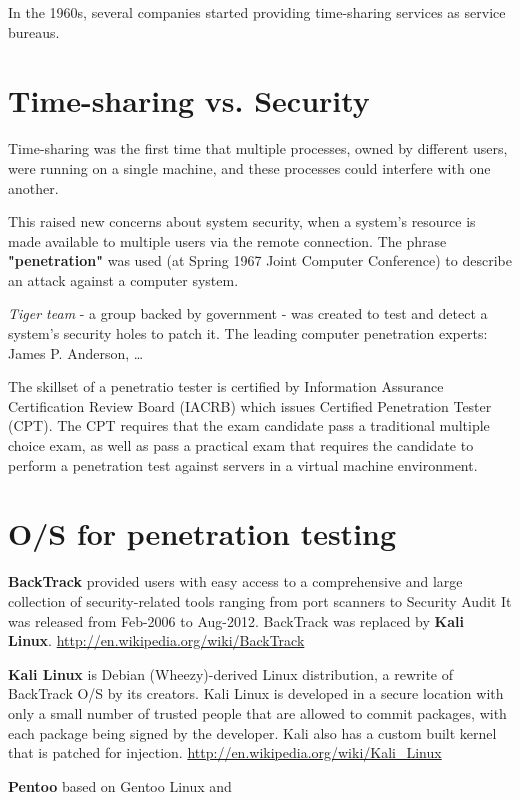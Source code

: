 In the 1960s, several companies started providing time-sharing services as
service bureaus.

\section{Time-sharing vs. Security}

Time-sharing was the first time that multiple processes, owned by different
users, were running on a single machine, and these processes could interfere
with one another.

This raised new concerns about system security, when a system's resource is made
available to multiple users via the remote connection. The phrase {\bf
"penetration"} was used (at Spring 1967 Joint Computer Conference) to describe
an attack against a computer system.

{\it Tiger team} - a group backed by government - was created to test and
detect a system's security holes to patch it. The leading computer penetration
experts: James P. Anderson, \ldots

The skillset of a penetratio tester is certified by Information Assurance
Certification Review Board (IACRB) which issues Certified Penetration Tester
(CPT).
The CPT requires that the exam candidate pass a traditional multiple choice
 exam, as well as pass a practical exam that requires the candidate to perform a
 penetration test against servers in a virtual machine environment.

\section{O/S for penetration testing}


{\bf BackTrack} provided users with easy access to a comprehensive and large
collection of security-related tools ranging from port scanners to Security Audit
It was released from Feb-2006 to Aug-2012. BackTrack was replaced by {\bf Kali
Linux}.
\url{http://en.wikipedia.org/wiki/BackTrack}

{\bf Kali Linux} is Debian (Wheezy)-derived Linux distribution, a rewrite of
BackTrack O/S by its creators. Kali Linux is developed in a secure location with only a
small number of trusted people that are allowed to commit packages, with each package being
signed by the developer. Kali also has a custom built kernel that is patched for
injection.
\url{http://en.wikipedia.org/wiki/Kali_Linux}


{\bf Pentoo} based on Gentoo Linux and 

